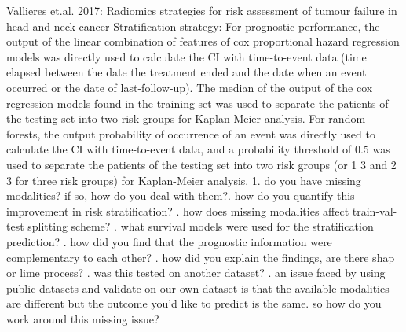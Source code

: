 \documentclass{article}%
\begin{document}
%
%
\newline%
\newline%
%
Vallieres et.al. 2017: Radiomics strategies for risk assessment of tumour failure in head{-}and{-}neck cancer%
\newline%
\newline%
%
Stratification strategy: For prognostic performance, the output of the linear combination of features of cox proportional hazard regression models was directly used to calculate the CI with time{-}to{-}event data (time elapsed between the date the treatment ended and the date when an event occurred or the date of last{-}follow{-}up). The median of the output of the cox regression models found in the training set was used to separate the patients of the testing set into two risk groups for Kaplan{-}Meier analysis. For random forests, the output probability of occurrence of an event was directly used to calculate the CI with time{-}to{-}event data, and a probability threshold of 0.5 was used to separate the patients of the testing set into two risk groups (or 1 3 and 2 3 for three risk groups) for Kaplan{-}Meier analysis.%
\newline%
\newline%
%
1. do you have missing modalities? if so, how do you deal with them?. how do you quantify this improvement in risk stratification?\newline%
. how does missing modalities affect train{-}val{-}test splitting scheme?\newline%
. what survival models were used for the stratification prediction?\newline%
. how did you find that the prognostic information were complementary to each other?\newline%
. how did you explain the findings, are there shap or lime process?\newline%
. was this tested on another dataset?\newline%
. an issue faced by using public datasets and validate on our own dataset is that the available modalities are different but the outcome you'd like to predict is the same. so how do you work around this missing issue?%
\newline%
\newline%
%
%
\newline%
\newline%
%
\end{document}
